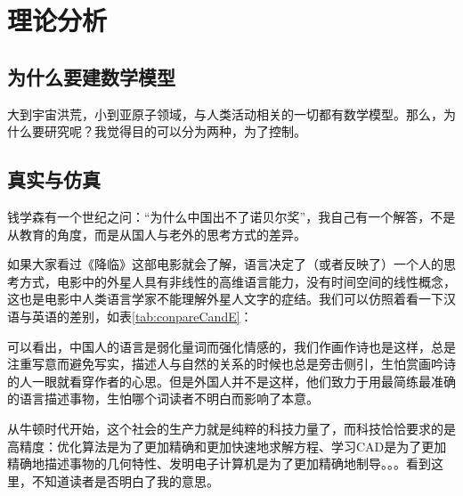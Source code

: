 \documentclass[UTF8]{ctexbook}
\begin{document}
\section{理论分析}
\subsection{为什么要建数学模型}
大到宇宙洪荒，小到亚原子领域，与人类活动相关的一切都有数学模型。那么，为什么要研究呢？我觉得目的可以分为两种，为了控制。



\subsection{真实与仿真}
钱学森有一个世纪之问：“为什么中国出不了诺贝尔奖”，我自己有一个解答，不是从教育的角度，而是从国人与老外的思考方式的差异。

如果大家看过《降临》这部电影就会了解，语言决定了（或者反映了）一个人的思考方式，电影中的外星人具有非线性的高维语言能力，没有时间空间的线性概念，这也是电影中人类语言学家不能理解外星人文字的症结。我们可以仿照着看一下汉语与英语的差别，如表\ref{tab:conpareCandE}：

\begin{table}[!htb]
	\renewcommand{\arraystretch}{1.3} %
	\caption{中英对比}\label{tab:conpareCandE}
	\centering
	\vspace{0.2cm}
\end{table}

可以看出，中国人的语言是弱化量词而强化情感的，我们作画作诗也是这样，总是注重写意而避免写实，描述人与自然的关系的时候也总是旁击侧引，生怕赏画吟诗的人一眼就看穿作者的心思。但是外国人并不是这样，他们致力于用最简练最准确的语言描述事物，生怕哪个词读者不明白而影响了本意。

从牛顿时代开始，这个社会的生产力就是纯粹的科技力量了，而科技恰恰要求的是高精度：优化算法是为了更加精确和更加快速地求解方程、学习CAD是为了更加精确地描述事物的几何特性、发明电子计算机是为了更加精确地制导。。。看到这里，不知道读者是否明白了我的意思。
\end{document}
